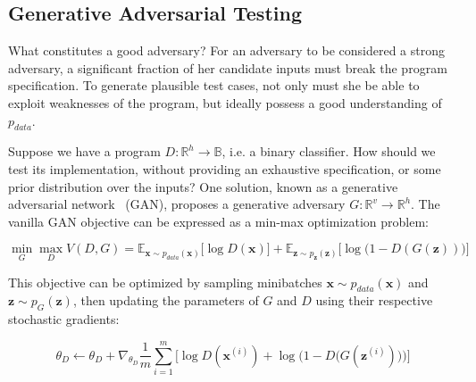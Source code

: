 
\subsection{Generative Adversarial Testing}

What constitutes a good adversary? For an adversary to be considered a strong adversary, a significant fraction of her candidate inputs must break the program specification. To generate plausible test cases, not only must she be able to exploit weaknesses of the program, but ideally possess a good understanding of $p_{data}$.

Suppose we have a program $D: \mathbb{R}^h\rightarrow\mathbb{B}$, i.e. a binary classifier. How should we test its implementation, without providing an exhaustive specification, or some prior distribution over the inputs? One solution, known as a generative adversarial network~\citep{goodfellow2014gan} (GAN), proposes a generative adversary $G: \mathbb{R}^v\rightarrow\mathbb{R}^h$. The vanilla GAN objective can be expressed as a min-max optimization problem:

\begin{equation}
\min_G \max_D V(D, G) = \mathbb{E}_{\mathbf x \sim p_{data}(\mathbf x)}\big[\log D(\mathbf x)\big] + \mathbb{E}_{\mathbf z \sim p_{\mathbf z}(\mathbf z)}\big[\log\big(1 - D(G(\mathbf z))\big)\big]
\end{equation}

This objective can be optimized by sampling minibatches $\mathbf x \sim p_{data}(\mathbf x)$ and $\mathbf z \sim p_{G}(\mathbf z)$, then updating the parameters of $G$ and $D$ using their respective stochastic gradients:

\begin{equation}
\theta_D \leftarrow \theta_D + \nabla_{\theta_D}\frac{1}{m}\sum_{i=1}^m\Big[\log D(\mathbf x^{(i)}) + \log\Big(1 - D\big(G(\mathbf z^{(i)})\big)\Big)\Big]
\end{equation}

